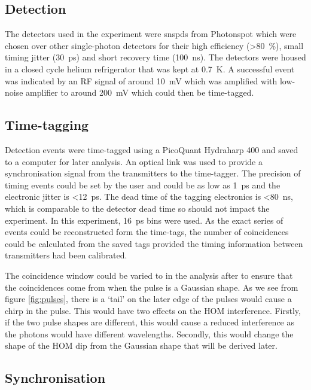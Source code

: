 \subsection{Detection}

The detectors used in the experiment were \acp{snspd} from Photonspot which were chosen over other single-photon detectors for their high efficiency (\SI{>80}{\percent}), small timing jitter (\SI{30}{\ps}) and short recovery time (\SI{100}{\ns}). The detectors were housed in a closed cycle helium refrigerator that was kept at \SI{0.7}{K}. A successful event was indicated by an RF signal of around \SI{10}{\mV} which was amplified with low-noise amplifier to around \SI{200}{\mV} which could then be time-tagged.

\subsection{Time-tagging}

Detection events were time-tagged using a PicoQuant Hydraharp 400 and saved to a computer for later analysis. An optical link was used to provide a synchronisation signal from the transmitters to the time-tagger. The precision of timing events could be set by the user and could be as low as \SI{1}{\ps} and the electronic jitter is \SI{<12}{\ps}. The dead time of the tagging electronics is \SI{<80}{\ns}, which is comparable to the detector dead time so should not impact the experiment. In this experiment, \SI{16}{\ps} bins were used. As the exact series of events could be reconstructed form the time-tags, the number of coincidences could be calculated from the saved tags provided the timing information between transmitters had been calibrated.

The coincidence window could be varied to in the analysis after to ensure that the coincidences come from when the pulse is a Gaussian shape. As we see from figure \ref{fig:pulses}, there is a `tail' on the later edge of the pulses would cause a chirp in the pulse. This would have two effects on the \ac{HOM} interference. Firstly, if the two pulse shapes are different, this would cause a reduced interference as the photons would have different wavelengths. Secondly, this would change the shape of the \ac{HOM} dip from the Gaussian shape that will be derived later.

\subsection{Synchronisation}

